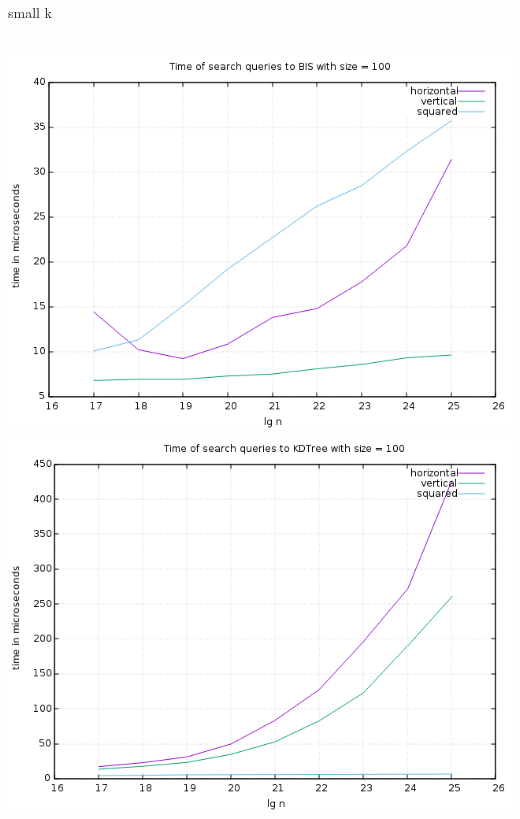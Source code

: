 \documentclass[pdf]{beamer}
\begin{document}
\begin{frame}{small k}
  \begin{columns}
    \includegraphics[scale=0.35]{pictures/analysis/smalls/all_100.png}
    \includegraphics[scale=0.35]{pictures/analysis/smalls/all_kdtree_100.png}
  \end{columns}
\end{frame}
\end{document}
